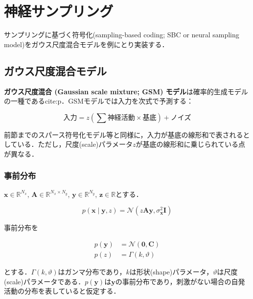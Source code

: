 \section{神経サンプリング}
サンプリングに基づく符号化(sampling-based coding; SBC or neural sampling model)をガウス尺度混合モデルを例にとり実装する．

\subsection{ガウス尺度混合モデル}
\textbf{ガウス尺度混合 (Gaussian scale mixture; GSM) モデル}は確率的生成モデルの一種である{cite:p}．GSMモデルでは入力を次式で予測する：

$$
\text{入力}={z}\left(\sum \text{神経活動} \times \text{基底} \right) + \text{ノイズ}
$$

前節までのスパース符号化モデル等と同様に，入力が基底の線形和で表されるとしている．ただし，尺度(scale)パラメータ$z$が基底の線形和に乗じられている点が異なる．

\subsubsection{事前分布}$\mathbf{x} \in \mathbb{R}^{N_x}$, $\mathbf{A} \in \mathbb{R}^{N_x\times N_y}$, $\mathbf{y} \in \mathbb{R}^{N_y}$, $\mathbf{z} \in \mathbb{R}$とする．

$$
p\left(\mathbf{x}\mid\mathbf{y}, z\right)=\mathcal{N}\left(z \mathbf{A} \mathbf{y}, \sigma_{\mathbf{x}}^{2} \mathbf{I}\right)
$$

事前分布を

$$
\begin{aligned}
p\left(\mathbf{y}\right)&=\mathcal{N}\left(\mathbf{0}, \mathbf{C}\right)\\
p\left(z\right)&=\Gamma (k, \vartheta)
\end{aligned}
$$

とする．$\Gamma(k, \vartheta)$はガンマ分布であり，$k$は形状(shape)パラメータ，$\vartheta$は尺度(scale)パラメータである．$p\left(\mathbf{y}\right)$は$\mathbf{y}$の事前分布であり，刺激がない場合の自発活動の分布を表していると仮定する．